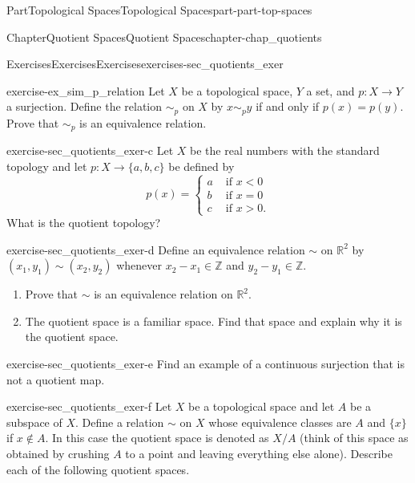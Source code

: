\documentclass[oneside,10pt,]{book}
\numberwithin{equation}{chapter}
\newcommand{\Z}{\mathbb{Z}}
\newcommand{\R}{\mathbb{R}}
\newcommand{\lt}{<}
\newcommand{\gt}{>}
\newcommand{\amp}{&}
\begin{document}
\begin{partptx}{Part}{Topological Spaces}{}{Topological Spaces}{}{}{part-part-top-spaces}
\begin{chapterptx}{Chapter}{Quotient Spaces}{}{Quotient Spaces}{}{}{chapter-chap_quotients}
\typeout{************************************************}
%
\begin{exercises-section}{Exercises}{Exercises}{}{Exercises}{}{}{exercises-sec_quotients_exer}
\begin{divisionexercise}{1}{}{}{exercise-ex_sim_p_relation}%
Let \(X\) be a topological space, \(Y\) a set, and \(p: X \to Y\) a surjection. Define the relation \(\sim_p\) on \(X\) by \(x \sim_p y\) if and only if \(p(x)=p(y)\). Prove that \(\sim_p\) is an equivalence relation.%
\end{divisionexercise}%
\begin{divisionexercise}{2}{}{}{exercise-sec_quotients_exer-c}%
Let \(X\) be the real numbers with the standard topology and let \(p: X \to \{a,b,c\}\) be defined by%
\begin{equation*}
p(x) = \begin{cases}a \amp \text{ if }  x \lt  0 \\ b \amp \text{ if }  x = 0 \\ c \amp \text{ if }  x \gt 0. \end{cases}
\end{equation*}
What is the quotient topology?%
\end{divisionexercise}%
\begin{divisionexercise}{3}{}{}{exercise-sec_quotients_exer-d}%
Define an equivalence relation \(\sim\) on \(\R^2\) by \((x_1,y_1) \sim (x_2,y_2)\) whenever \(x_2 - x_1 \in \Z\) and \(y_2 - y_1 \in \Z\).%
\begin{enumerate}[font=\bfseries,label=(\alph*),ref=\alph*]%
\item{}Prove that \(\sim\) is an equivalence relation on \(\R^2\).%
\item{}The quotient space is a familiar space. Find that space and explain why it is the quotient space.%
\end{enumerate}%
\end{divisionexercise}%
\begin{divisionexercise}{4}{}{}{exercise-sec_quotients_exer-e}%
Find an example of a continuous surjection that is not a quotient map.%
\end{divisionexercise}%
\begin{divisionexercise}{5}{}{}{exercise-sec_quotients_exer-f}%
Let \(X\) be a topological space and let \(A\) be a subspace of \(X\). Define a relation \(\sim\) on \(X\) whose equivalence classes are \(A\) and \(\{x\}\) if \(x \notin A\). In this case the quotient space is denoted as \(X/A\) (think of this space as obtained by crushing \(A\) to a point and leaving everything else alone). Describe each of the following quotient spaces.%

\end{divisionexercise}
\end{exercises-section}
\end{chapterptx}
\end{partptx}
\end{document}
